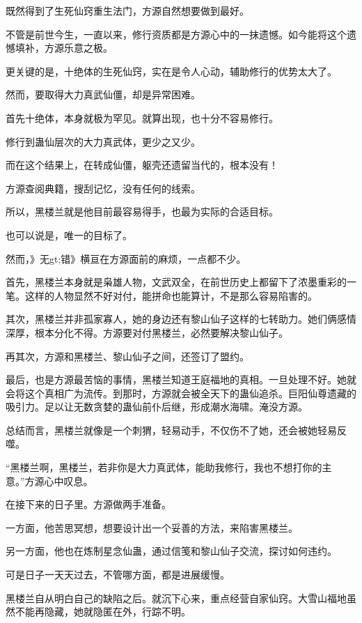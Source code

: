 
\begin{this_body}

既然得到了生死仙窍重生法门，方源自然想要做到最好。

不管是前世今生，一直以来，修行资质都是方源心中的一抹遗憾。如今能将这个遗憾填补，方源乐意之极。

更关键的是，十绝体的生死仙窍，实在是令人心动，辅助修行的优势太大了。

然而，要取得大力真武仙僵，却是异常困难。

首先十绝体，本身就极为罕见。就算出现，也十分不容易修行。

修行到蛊仙层次的大力真武体，更少之又少。

而在这个结果上，在转成仙僵，躯壳还遗留当代的，根本没有！

方源查阅典籍，搜刮记忆，没有任何的线索。

所以，黑楼兰就是他目前最容易得手，也最为实际的合适目标。

也可以说是，唯一的目标了。

然而，》无gt;错》横亘在方源面前的麻烦，一点都不少。

首先，黑楼兰本身就是枭雄人物，文武双全，在前世历史上都留下了浓墨重彩的一笔。这样的人物显然不好对付，能拼命也能算计，不是那么容易陷害的。

其次，黑楼兰并非孤家寡人，她的身边还有黎山仙子这样的七转助力。她们俩感情深厚，根本分化不得。方源要对付黑楼兰，必然要解决黎山仙子。

再其次，方源和黑楼兰、黎山仙子之间，还签订了盟约。

最后，也是方源最苦恼的事情，黑楼兰知道王庭福地的真相。一旦处理不好。她就会将这个真相广为流传。到那时，方源就会被全天下的蛊仙追杀。巨阳仙尊遗藏的吸引力。足以让无数贪婪的蛊仙前仆后继，形成潮水海啸。淹没方源。

总结而言，黑楼兰就像是一个刺猬，轻易动手，不仅伤不了她，还会被她轻易反噬。

“黑楼兰啊，黑楼兰，若非你是大力真武体，能助我修行，我也不想打你的主意。”方源心中叹息。

在接下来的日子里。方源做两手准备。

一方面，他苦思冥想，想要设计出一个妥善的方法，来陷害黑楼兰。

另一方面，他也在炼制星念仙蛊，通过信笺和黎山仙子交流，探讨如何违约。

可是日子一天天过去，不管哪方面，都是进展缓慢。

黑楼兰自从明白自己的缺陷之后。就沉下心来，重点经营自家仙窍。大雪山福地虽然不能再隐藏，她就隐匿在外，行踪不明。


\end{this_body}
